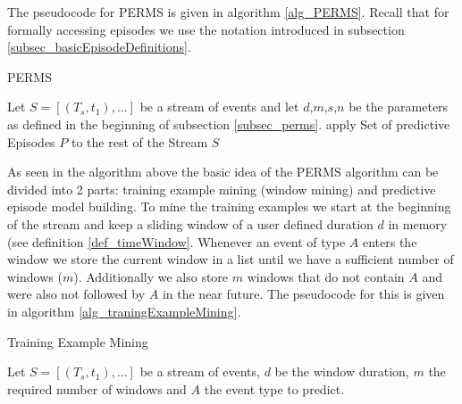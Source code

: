 The pseudocode for PERMS is given in algorithm \ref{alg_PERMS}. Recall that for formally accessing episodes we use the notation introduced in subsection \ref{subsec_basicEpisodeDefinitions}.

\begin{algorithm}[H]
  \caption{PERMS
    \label{alg_PERMS}}
  \begin{algorithmic}[1]
    \Statex
    \Require Let $S=[(T_s,t_1),...]$ be a stream of events and let $d$,$m$,$s$,$n$ be the parameters as defined in the beginning of subsection \ref{subsec_perms}.
      \State apply Set of predictive Episodes $P$ to the rest of the Stream $S$
    \EndFunction
  \end{algorithmic}
\end{algorithm}

As seen in the algorithm above the basic idea of the PERMS algorithm can be divided into 2 parts: training example mining (window mining) and predictive episode model building. To mine the training examples we start at the beginning of the stream and keep a sliding window of a user defined duration $d$ in memory (see definition \ref{def_timeWindow}. Whenever an event of type $A$ enters the window we store the current window in a list until we have a sufficient number of windows ($m$). Additionally we also store $m$ windows that do not contain $A$ and were also not followed by $A$ in the near future. The pseudocode for this is given in algorithm \ref{alg_traningExampleMining}.

\begin{algorithm}[H]
  \caption{Training Example Mining
    \label{alg_traningExampleMining}}
  \begin{algorithmic}[1]
    \Statex
    \Require Let $S=[(T_s,t_1),...]$ be a stream of events, $d$ be the window duration, $m$ the required number of windows and $A$ the event type to predict.
          	\EndIf
       	\EndIf
      \EndWhile
      \State {}
    \EndFunction
  \end{algorithmic}
\end{algorithm}

